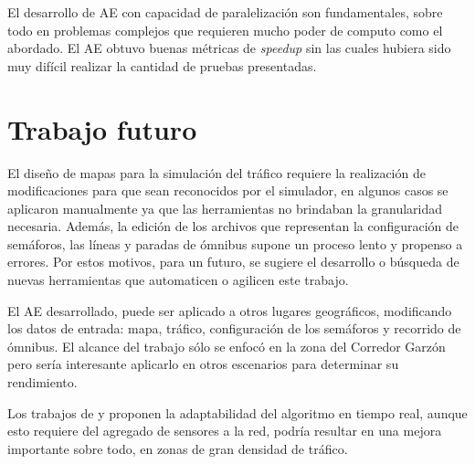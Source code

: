 El desarrollo de AE con capacidad de paralelización son fundamentales, sobre todo en problemas complejos que requieren mucho poder de computo como el abordado. El AE obtuvo buenas métricas de \emph{speedup} sin las cuales hubiera sido muy difícil realizar la cantidad de pruebas presentadas.

\section{Trabajo futuro}

El diseño de mapas para la simulación del tráfico requiere la realización de modificaciones para que sean reconocidos por el simulador, en algunos casos se aplicaron manualmente ya que las herramientas no brindaban la granularidad necesaria. Además, la edición de los archivos que representan la configuración de semáforos, las líneas y paradas de ómnibus supone un proceso lento y propenso a errores. Por estos motivos, para un futuro, se sugiere el desarrollo o búsqueda de nuevas herramientas que automaticen o agilicen este trabajo.

El AE desarrollado, puede ser aplicado a otros lugares geográficos, modificando  los datos de entrada: mapa, tráfico, configuración de los semáforos y recorrido de ómnibus. El alcance del trabajo sólo se enfocó en la zona del Corredor Garzón pero sería interesante aplicarlo en otros escenarios para determinar su rendimiento.

Los trabajos de  \citet{Montana1996} y \citet{Vogel2000} proponen la adaptabilidad del algoritmo en tiempo real, aunque esto requiere del agregado de sensores a la red, podría resultar en una mejora importante sobre todo, en zonas de gran densidad de tráfico.
